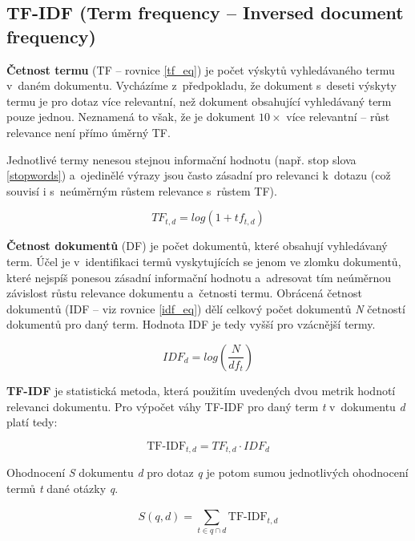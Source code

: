 \subsection{TF-IDF (Term frequency -- Inversed document frequency)}
\label{tf-idf}

\textbf{Četnost termu} (TF -- rovnice \ref{tf_eq}) je počet výskytů vyhledávaného termu v~daném dokumentu. Vycházíme z~předpokladu, že dokument s~deseti výskyty termu je pro dotaz více relevantní, než dokument obsahující vyhledávaný term pouze jednou. Neznamená to však, že je dokument $10\times$ více relevantní -- růst relevance není přímo úměrný TF.\par
Jednotlivé termy nenesou stejnou informační hodnotu (např. stop slova \ref{stopwords}) a~ojedinělé výrazy jsou často zásadní pro relevanci k~dotazu (což souvisí i s~neúměrným růstem relevance s~růstem TF).\par

\begin{equation}
\label{tf_eq}
    TF_{t,d} = log(1+tf_{t,d})
\end{equation}

\textbf{Četnost dokumentů} (DF) je počet dokumentů, které obsahují vyhledávaný term. Účel je v~identifikaci termů vyskytujících se jenom ve zlomku dokumentů, které nejspíš ponesou zásadní informační hodnotu a~adresovat tím neúměrnou závislost růstu relevance dokumentu a~četnosti termu. Obrácená četnost dokumentů (IDF -- viz rovnice \ref{idf_eq}) dělí celkový počet dokumentů \emph{N} četností dokumentů pro daný term. Hodnota IDF je tedy vyšší pro vzácnější termy.\par

\begin{equation}
\label{idf_eq}
    IDF_{d} = log(\frac{N}{df_t})
\end{equation}

\textbf{TF-IDF} je statistická metoda, která použitím uvedených dvou metrik hodnotí relevanci dokumentu.
Pro výpočet váhy TF-IDF pro daný term \emph{t} v~dokumentu \emph{d} platí tedy:

\begin{equation}
    \text{TF-IDF}_{t,d} = TF_{t,d} \cdot IDF_d
\end{equation}

Ohodnocení \emph{S} dokumentu \emph{d} pro dotaz \emph{q} je potom sumou jednotlivých ohodnocení termů \emph{t} dané otázky \emph{q}.

\begin{equation}
    S(q,d) = \sum_{t\in{q \cap d}}^{}\text{TF-IDF}_{t,d}
\end{equation}

